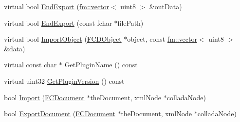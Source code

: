 \begin{DoxyCompactItemize}
\item 
virtual bool \hyperlink{classFArchiveXML_a877083fc6c055f24042dd50103fb00a4}{EndExport} (\hyperlink{classfm_1_1vector}{fm::vector}$<$ uint8 $>$ \&outData)
\item 
virtual bool \hyperlink{classFArchiveXML_a19693477bc5410a640105cec37febdb6}{EndExport} (const fchar $\ast$filePath)
\item 
virtual bool \hyperlink{classFArchiveXML_a323f1807851e536b1c46f7583303518e}{ImportObject} (\hyperlink{classFCDObject}{FCDObject} $\ast$object, const \hyperlink{classfm_1_1vector}{fm::vector}$<$ uint8 $>$ \&data)
\item 
virtual const char $\ast$ \hyperlink{classFArchiveXML_abd9ac092eff78dbc8f8249fa402fe644}{GetPluginName} () const 
\item 
virtual uint32 \hyperlink{classFArchiveXML_a2fb1d4d2d6d862e023d8510ea404bd60}{GetPluginVersion} () const 
\item 
bool \hyperlink{classFArchiveXML_a31a7807261de79f1f8b9e539e7dff0ea}{Import} (\hyperlink{classFCDocument}{FCDocument} $\ast$theDocument, xmlNode $\ast$colladaNode)
\item 
bool \hyperlink{classFArchiveXML_a924a76fcef59b49c82ce323badbcc469}{ExportDocument} (\hyperlink{classFCDocument}{FCDocument} $\ast$theDocument, xmlNode $\ast$colladaNode)
\end{DoxyCompactItemize}
